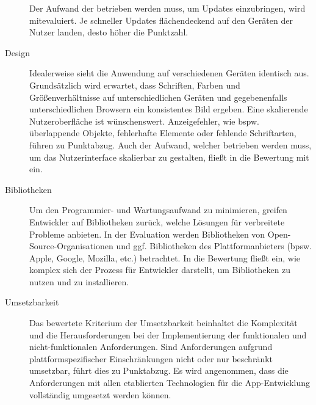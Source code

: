\begin{description}
	      Der Aufwand der betrieben werden muss, um Updates einzubringen, wird mitevaluiert. Je schneller Updates flächendeckend auf den Geräten der Nutzer landen, desto höher die Punktzahl.

	\item [Design]
	      Idealerweise sieht die Anwendung auf verschiedenen Geräten identisch aus. Grundsätzlich wird erwartet, dass Schriften, Farben und Größenverhältnisse auf unterschiedlichen Geräten und gegebenenfalls unterschiedlichen Browsern ein konsistentes Bild ergeben.
	      Eine skalierende Nutzeroberfläche ist wünschenswert. Anzeigefehler, wie bspw. überlappende Objekte, fehlerhafte Elemente oder fehlende Schriftarten, führen zu Punktabzug. Auch der Aufwand, welcher betrieben werden muss, um das Nutzerinterface skalierbar zu gestalten, fließt in die Bewertung mit ein.

	      

	\item[Bibliotheken]
		Um den Programmier- und Wartungsaufwand zu minimieren, greifen Entwickler auf Bibliotheken zurück, welche Lösungen für verbreitete Probleme anbieten.
		 In der Evaluation werden Bibliotheken von Open-Source-Organisationen und ggf. Bibliotheken des Plattformanbieters (bpsw. Apple, Google, Mozilla, etc.) betrachtet. In die Bewertung fließt ein, wie komplex sich der Prozess für Entwickler darstellt, um Bibliotheken zu nutzen und zu installieren. 

	\item[Umsetzbarkeit]
		Das bewertete Kriterium der Umsetzbarkeit beinhaltet die Komplexität und die Herausforderungen bei der Implementierung der funktionalen und nicht-funktionalen Anforderungen. Sind Anforderungen aufgrund plattformspezifischer Einschränkungen nicht oder nur beschränkt umsetzbar, führt dies zu Punktabzug. Es wird angenommen, dass die Anforderungen mit allen etablierten Technologien für die App-Entwicklung vollständig umgesetzt werden können.
		

\end{description}
